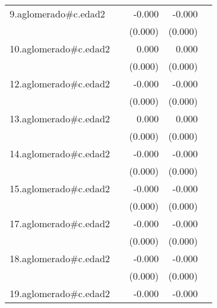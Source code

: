 {\begin{longtable}{l*{4}{D{.}{.}{-1}}}
\addlinespace
9.aglomerado#c.edad2&                     &      -0.000         &      -0.000         &                     \\
            &                     &     (0.000)         &     (0.000)         &                     \\
\addlinespace
10.aglomerado#c.edad2&                     &       0.000         &       0.000         &                     \\
            &                     &     (0.000)         &     (0.000)         &                     \\
\addlinespace
12.aglomerado#c.edad2&                     &      -0.000         &      -0.000         &                     \\
            &                     &     (0.000)         &     (0.000)         &                     \\
\addlinespace
13.aglomerado#c.edad2&                     &       0.000         &       0.000         &                     \\
            &                     &     (0.000)         &     (0.000)         &                     \\
\addlinespace
14.aglomerado#c.edad2&                     &      -0.000         &      -0.000\sym{*}  &                     \\
            &                     &     (0.000)         &     (0.000)         &                     \\
\addlinespace
15.aglomerado#c.edad2&                     &      -0.000         &      -0.000         &                     \\
            &                     &     (0.000)         &     (0.000)         &                     \\
\addlinespace
17.aglomerado#c.edad2&                     &      -0.000         &      -0.000         &                     \\
            &                     &     (0.000)         &     (0.000)         &                     \\
\addlinespace
18.aglomerado#c.edad2&                     &      -0.000         &      -0.000         &                     \\
            &                     &     (0.000)         &     (0.000)         &                     \\
\addlinespace
19.aglomerado#c.edad2&                     &      -0.000         &      -0.000         &                     \\

\end{longtable}}
